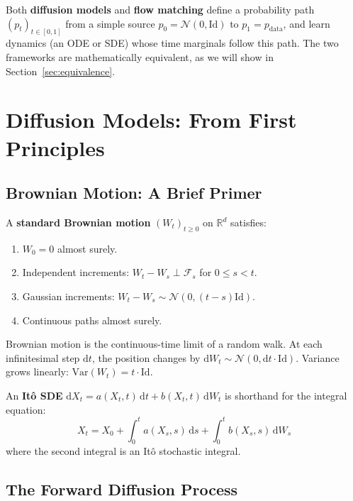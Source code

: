 \documentclass[11pt, a4paper]{article}
\newcommand{\Rd}{\mathbb{R}}
\newcommand{\Id}{\mathrm{Id}}
\newcommand{\pdata}{p_{\mathrm{data}}}
\newcommand{\dd}{\mathrm{d}}
\theoremstyle{plain}
\theoremstyle{definition}
\theoremstyle{remark}
\begin{document}
Both \textbf{diffusion models} and \textbf{flow matching} define a probability path $(p_t)_{t \in [0,1]}$ from a simple source $p_0 = \mathcal{N}(0, \Id)$ to $p_1 = \pdata$, and learn dynamics (an ODE or SDE) whose time marginals follow this path. The two frameworks are mathematically equivalent, as we will show in Section~\ref{sec:equivalence}.

\section{Diffusion Models: From First Principles}
\label{sec:diffusion}

\subsection{Brownian Motion: A Brief Primer}

\begin{defbox}
A \textbf{standard Brownian motion} $(W_t)_{t \geq 0}$ on $\Rd^d$ satisfies:
\begin{enumerate}
  \item $W_0 = 0$ almost surely.
  \item Independent increments: $W_t - W_s \perp \mathcal{F}_s$ for $0 \leq s < t$.
  \item Gaussian increments: $W_t - W_s \sim \mathcal{N}(0, (t-s)\Id)$.
  \item Continuous paths almost surely.
\end{enumerate}
\end{defbox}

\begin{intubox}
Brownian motion is the continuous-time limit of a random walk. At each infinitesimal step $\dd t$, the position changes by $\dd W_t \sim \mathcal{N}(0, \dd t \cdot \Id)$. Variance grows linearly: $\mathrm{Var}(W_t) = t \cdot \Id$.
\end{intubox}

An \textbf{It\^{o} SDE} $\dd X_t = a(X_t, t)\,\dd t + b(X_t, t)\,\dd W_t$ is shorthand for the integral equation:
\[
  X_t = X_0 + \int_0^t a(X_s, s)\,\dd s + \int_0^t b(X_s, s)\,\dd W_s
\]
where the second integral is an It\^{o} stochastic integral.

\subsection{The Forward Diffusion Process}
\end{document}

